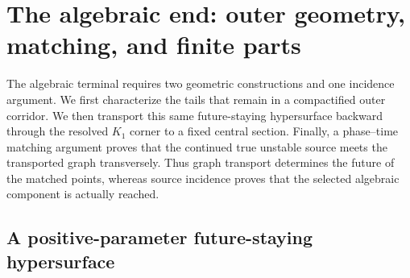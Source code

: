 \documentclass[11pt,reqno]{amsart}
\numberwithin{equation}{section}
\theoremstyle{definition}
\theoremstyle{remark}
\begin{document}
\section{The algebraic end: outer geometry, matching, and finite parts}\label{sec:outer}

The algebraic terminal requires two geometric constructions and one
incidence argument.  We first characterize the tails that remain in a
compactified outer corridor.  We then transport this same future-staying
hypersurface backward through the resolved $K_1$ corner to a fixed central
section.  Finally, a phase--time matching argument proves that the continued
true unstable source meets the transported graph transversely.  Thus graph
transport determines the future of the matched points, whereas source
incidence proves that the selected algebraic component is actually reached.

\subsection{A positive-parameter future-staying hypersurface}
\end{document}
